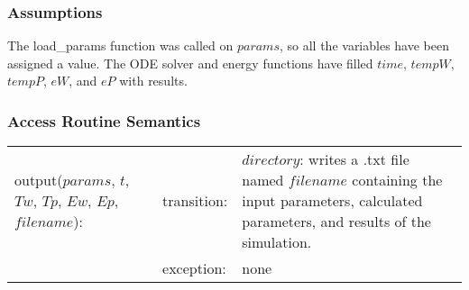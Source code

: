 \documentclass[12pt]{article}
\begin{document}
\subsubsection{Assumptions}
The load\_params function was called on $params$, so all the variables have been assigned a value. The ODE solver and energy functions have filled $time$, $tempW$, $tempP$, $eW$, and $eP$ with results.
\subsubsection{Access Routine Semantics}
\begin{center}
\begin{tabular}{l l p{6cm}}
output($params$, $t$, $Tw$, $Tp$, $Ew$, $Ep$, $filename$): & transition: & $directory$: writes a .txt file named $filename$ containing the input parameters, calculated parameters, and results of the simulation. \\
& exception: & none \\
\end{tabular}
\end{center}
\end{document}
